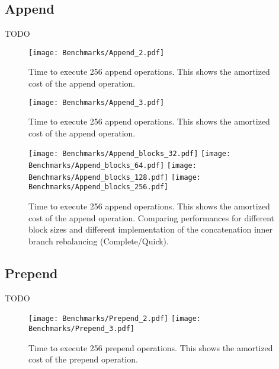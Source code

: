 \subsection{Append}

\color{red} TODO \color{black}

\begin{figure}[h!]
  \centering
  \texttt{[image: Benchmarks/Append\_2.pdf]}
  \label{Append2Benchmarks}
  \caption{Time to execute 256 append operations. This shows the amortized cost of the append operation.}
\end{figure}

\begin{figure}[h!]
  \centering
  \texttt{[image: Benchmarks/Append\_3.pdf]}
  \label{Append3Benchmarks}
  \caption{Time to execute 256 append operations. This shows the amortized cost of the append operation.}
\end{figure}

\begin{figure}[h!]
  \centering
  \texttt{[image: Benchmarks/Append\_blocks\_32.pdf]}
  \texttt{[image: Benchmarks/Append\_blocks\_64.pdf]}
  \texttt{[image: Benchmarks/Append\_blocks\_128.pdf]}
  \texttt{[image: Benchmarks/Append\_blocks\_256.pdf]}
  \label{IterationBlocksBenchmarks}
  \caption{Time to execute 256 append operations. This shows the amortized cost of the append operation. Comparing performances for different block sizes and different implementation of the concatenation inner branch rebalancing (Complete/Quick).}
\end{figure}

\subsection{Prepend}
\color{red} TODO \color{black}

\begin{figure}[h!]
  \centering
  \texttt{[image: Benchmarks/Prepend\_2.pdf]}
  \texttt{[image: Benchmarks/Prepend\_3.pdf]}
  \label{PrependBenchmarks}
  \caption{Time to execute 256 prepend operations. This shows the amortized cost of the prepend operation.}
\end{figure}

